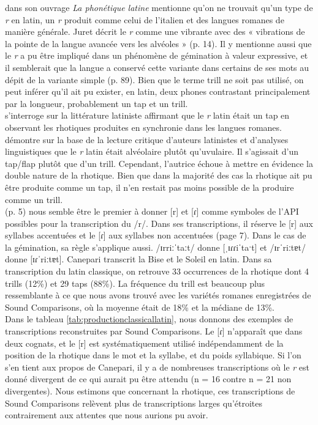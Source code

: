 \textcite{juretPhonetiqueLatine1938} dans son ouvrage \textit{La phonétique latine} mentionne qu'on ne trouvait qu'un type de \textit{r} en latin, un \textit{r} produit comme celui de l'italien et des langues romanes de manière générale. Juret décrit le \textit{r} comme une vibrante avec des « vibrations de la pointe de la langue avancée vers les alvéoles » (p. 14). Il y mentionne aussi que le \textit{r} a pu être impliqué dans un phénomène de gémination à valeur expressive, et il semblerait que la langue a conservé cette variante dans certains de ses mots au dépit de la variante simple (p. 89). Bien que le terme trill ne soit pas utilisé, on peut inférer qu'il ait pu exister, en latin, deux phones contrastant principalement par la longueur, probablement un tap et un trill. \\

\textcite{pultrovaPhoneticNatureLatin2013} s'interroge sur la littérature latiniste affirmant que le \textit{r} latin était un tap en observant les rhotiques produites en synchronie dans les langues romanes. \citeauthor{pultrovaPhoneticNatureLatin2013} démontre sur la base de la lecture critique d'auteurs latinistes et d'analyses linguistiques que le \textit{r} latin était alvéolaire plutôt qu'uvulaire. Il s'agissait d'un tap/flap plutôt que d'un trill. Cependant, l'autrice échoue à mettre en évidence la double nature de la rhotique. Bien que dans la majorité des cas la rhotique ait pu être produite comme un tap, il n'en restait pas moins possible de la produire comme un trill.\\

\textcite{canepariPronunciaNeutraInternazionale2008} (p. 5) nous semble être le premier à donner [r] et [ɾ] comme symboles de l'API possibles pour la transcription du /r/. Dans ses transcriptions, il réserve le [r] aux syllabes accentuées et le [ɾ] aux syllabes non accentuées (page 7). Dans le cas de la gémination, sa règle s'applique aussi. /ɪrriːˈtaːt/ donne [ˌɪɾɾiˈtaˑt] et /ɪrˈriːtɐt/ donne [ɪɾˈriːtɐt]. Canepari transcrit la Bise et le Soleil en latin. Dans sa transcription du latin classique, on retrouve 33 occurrences de la rhotique dont 4 trills (12\%) et 29 taps (88\%). La fréquence du trill est beaucoup plus ressemblante à ce que nous avons trouvé avec les variétés romanes enregistrées de Sound Comparisons, où la moyenne était de 18\% et la médiane de 13\%.\\

Dans le tableau \ref{tab:productionclassicallatin}, nous donnons des exemples de transcriptions reconstruites par Sound Comparisons. Le [ɾ] n'apparaît que dans deux cognats, et le [r] est systématiquement utilisé indépendamment de la position de la rhotique dans le mot et la syllabe, et du poids syllabique. Si l'on s'en tient aux propos de Canepari, il y a de nombreuses transcriptions où le \textit{r} est donné divergent de ce qui aurait pu être attendu (n = 16 contre n = 21 non divergentes). 
Nous estimons que concernant la rhotique, ces transcriptions de Sound Comparisons relèvent plus de transcriptions larges qu'étroites contrairement aux attentes que nous aurions pu avoir.\\

